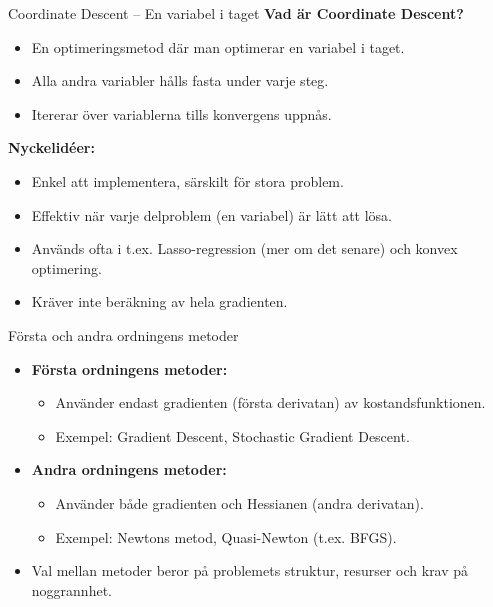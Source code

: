 \documentclass[10pt,english]{beamer}
\begin{document}
\begin{frame}{Coordinate Descent – En variabel i taget}
    \textbf{Vad är Coordinate Descent?}
    \begin{itemize}
        \item En optimeringsmetod där man optimerar en variabel i taget.
        \item Alla andra variabler hålls fasta under varje steg.
        \item Itererar över variablerna tills konvergens uppnås.
    \end{itemize}

    \vspace{0.3cm}
    \textbf{Nyckelidéer:}
    \begin{itemize}
        \item Enkel att implementera, särskilt för stora problem.
        \item Effektiv när varje delproblem (en variabel) är lätt att lösa.
        \item Används ofta i t.ex. Lasso-regression (mer om det senare) och konvex optimering.
        \item Kräver inte beräkning av hela gradienten.
    \end{itemize}
\end{frame}

\begin{frame}{Första och andra ordningens metoder}
  \begin{itemize}
    \item \textbf{Första ordningens metoder:}
    \begin{itemize}
      \item Använder endast gradienten (första derivatan) av kostandsfunktionen.
      \item Exempel: Gradient Descent, Stochastic Gradient Descent.
    \end{itemize}
    \item \textbf{Andra ordningens metoder:}
    \begin{itemize}
      \item Använder både gradienten och Hessianen (andra derivatan).
      \item Exempel: Newtons metod, Quasi-Newton (t.ex. BFGS).
    \end{itemize}
    \item Val mellan metoder beror på problemets struktur, resurser och krav på noggrannhet.
  \end{itemize}
\end{frame}
\end{document}
